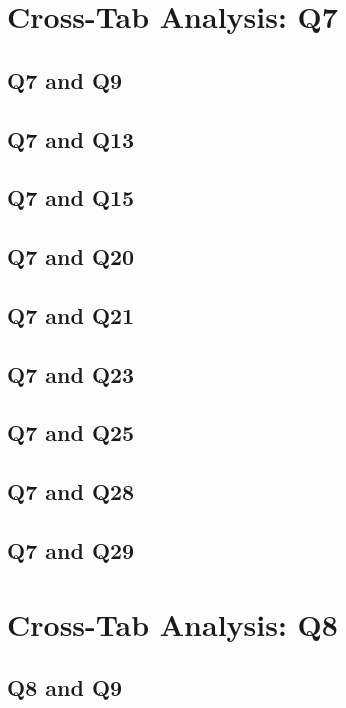 \documentclass{report}
\begin{document}
\chapter{Cross-Tab Analysis: Q7}

\section{Q7 and Q9}\clearpage
\section{Q7 and Q13}\clearpage
\section{Q7 and Q15}\clearpage
\section{Q7 and Q20}\clearpage
\section{Q7 and Q21}\clearpage
\section{Q7 and Q23}\clearpage
\section{Q7 and Q25}\clearpage
\section{Q7 and Q28}\clearpage
\section{Q7 and Q29}\clearpage

\chapter{Cross-Tab Analysis: Q8}

\section{Q8 and Q9}\clearpage
\end{document}
